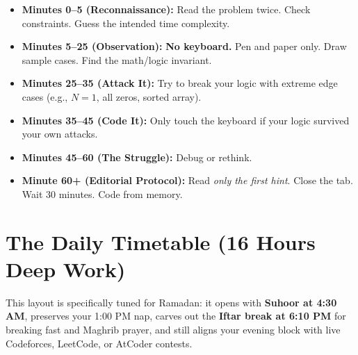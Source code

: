 \documentclass[12pt, a4paper]{article}
\begin{document}
\begin{sidebar}
\begin{itemize}[leftmargin=1.5em, itemsep=6pt]

  \item \textbf{Minutes 0--5 (Reconnaissance):} Read the problem twice. Check
        constraints. Guess the intended time complexity.

  \item \textbf{Minutes 5--25 (Observation):} \textbf{No keyboard.} Pen and
        paper only. Draw sample cases. Find the math/logic invariant.

  \item \textbf{Minutes 25--35 (Attack It):} Try to break your logic with
        extreme edge cases (e.g., $N = 1$, all zeros, sorted array).

  \item \textbf{Minutes 35--45 (Code It):} Only touch the keyboard if your
        logic survived your own attacks.

  \item \textbf{Minutes 45--60 (The Struggle):} Debug or rethink.

  \item \textbf{Minute 60+ (Editorial Protocol):} Read \emph{only the first
        hint}. Close the tab. Wait 30 minutes. Code from memory.

\end{itemize}
\end{sidebar}

\section{The Daily Timetable (16 Hours Deep Work)}

This layout is specifically tuned for Ramadan: it opens with\textbf{ Suhoor at 4:30 AM},
preserves your 1:00 PM nap, carves out the \textbf{Iftar break at 6:10 PM} for breaking
fast and Maghrib prayer, and still aligns your evening block with live Codeforces,
LeetCode, or AtCoder contests.
\end{document}
